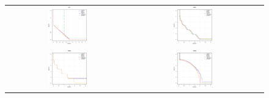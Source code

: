 \begin{figure}[h]
\begin{tabular}{ccc}
  \includegraphics[width=0.33\textwidth]{Surfaces/UF7.eps} &


  \includegraphics[width=0.33\textwidth]{Surfaces/WFG1.eps} 
  \\
  \includegraphics[width=0.33\textwidth]{Surfaces/WFG2.eps} &


  \includegraphics[width=0.33\textwidth]{Surfaces/WFG8.eps} &


\end{tabular}
\end{figure}
